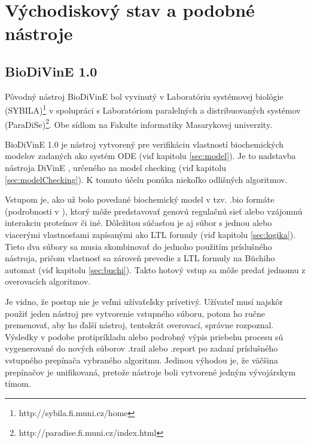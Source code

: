 \documentclass[11pt,final,oneside]{fithesis}
\begin{document}
\chapter{V\'ychodiskov\'y stav a podobn\' e n\'astroje}
\label{sec:similarTools}

\section{BioDiVinE 1.0}
\label{sec:biodivine}
P\^ ovodn\'y n\'astroj BioDiVinE bol vyvinut\'y v Laborat\'oriu syst\'emovej biol\'ogie (SYBILA)\footnote{http://sybila.fi.muni.cz/home} v spolupr\'aci 
s Laborat\'oriom paraleln\'ych a distribuovan\'ych syst\'emov (ParaDiSe)\footnote{http://paradise.fi.muni.cz/index.html}. Obe s\'idlom na Fakulte 
informatiky Masarykovej univerzity. 

BioDiVinE 1.0 je n\'astroj vytvoren\'y pre verifik\'aciu vlastnost\'i biochemick\'ych modelov zadan\'ych ako syst\'em ODE (vi\v d kapitolu \ref{sec:model}).
Je to nadstavba n\'astroja DiVinE \cite{divine}, ur\v cen\'eho na model checking (vi\v d kapitolu \ref{sec:modelChecking}). K tomuto 
\'u\v celu pon\'uka nieko\v lko odli\v sn\'ych algoritmov.

Vstupom je, ako u\v z bolo povedan\'e biochemick\'y model v tzv. .bio form\'ate (podrobnosti v \cite{sybila-biodivine}), ktor\'y 
m\^ o\v ze predstavova\v t genov\'u regula\v cn\'u sie\v t alebo vz\'ajomn\'u interakciu prote\'inov \v ci in\'e. D\^ ole\v zitou s\'u\v cas\v tou je aj
s\'ubor s jednou alebo viacer\'ymi vlastnos\v tami zap\'isan\'ymi ako LTL formuly (vi\v d kapitolu \ref{sec:logika}). Tieto dva s\'ubory sa musia skombinova\v t
do jednoho pou\v zit\'im pr\'islu\v sn\'eho n\'astroja, pri\v com vlastnos\v t sa z\'arove\v n prevedie z LTL formuly na B\" uchiho automat (vi\v d kapitolu 
\ref{sec:buchi}). Takto hotov\'y vstup sa m\^ o\v ze preda\v t jednomu z overovac\'ich algoritmov.

Je vidno, \v ze postup nie je ve\v lmi u\v z\'iva\v te\v lsky pr\'ivetiv\'y. U\v z\'ivate\v l mus\'i najsk\^ or pou\v zi\v t jeden n\'astroj 
pre vytvorenie vstupn\'eho s\'uboru, potom ho ru\v cne premenova\v t, aby ho \v dal\v s\'i n\'astroj, tentokr\'at overovac\'i, spr\'avne rozpoznal. V\'ysledky
v podobe protipr\'ikladu alebo podrobn\'y v\'ypis priebehu procesu s\'u vygenerovan\'e do nov\'ych s\'uborov .trail alebo .report po zadan\'i pr\'islu\v sn\'eho
vstupn\'eho prep\'ina\v ca vybran\'eho algoritmu. Jedinou v\'yhodou je, \v ze v\"a\v c\v sina prep\'ina\v cov je unifikovan\'a, preto\v ze n\'astroje boli vytvoren\'e
jedn\'ym v\'yvoj\'arskym t\'imom.
\end{document}
